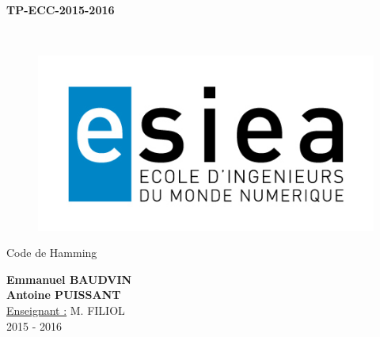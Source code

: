 \begin{titlepage}
      \begin{center}   
        \Huge
        \textbf{TP-ECC-2015-2016}
        
        \LARGE
        ~
        
        
        \vfill
        \begin{figure}[H]
	    \centering
	    \begin{minipage}{0.89\textwidth}
		\centering
		\includegraphics[width=\textwidth]{./img/esiea.jpeg}
	    \end{minipage}
	\end{figure}
        \vfill
        
        \vspace{0.5cm}
        
        Code de Hamming
        
        \vspace{2cm}
        \textbf{Emmanuel BAUDVIN\\Antoine PUISSANT}\\
        \vspace{0.8cm}
        \Large
        \underline{Enseignant :} M. FILIOL\\
        \vspace{0.5cm}
        2015 - 2016%
        
    \end{center}
\end{titlepage}